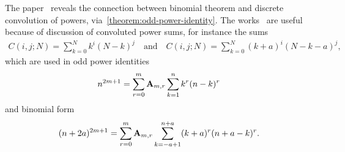 The paper~\cite{on_the_link_between_binomial_theorem_and_discrete_convolution} reveals the connection
between binomial theorem and discrete convolution of powers, via~\eqref{theorem:odd-power-identity}.
The works~\cite{glaisher19121n,neuman1977evaluation,carlitz1977note} are useful because
of discussion of convoluted power sums,
for instance the sums
\begin{align*}
    C(i,j;N) = \sum_{k=0}^{N} k^i (N-k)^j \quad \mathrm{and} \quad C(i,j;N) = \sum_{k=0}^{N} (k+a)^i (N-k-a)^j,
\end{align*}
which are used in odd power identities
\begin{align*}
    n^{2m+1} = \sum_{r=0}^{m} {\mathbf{A}} \sb{m,r} \sum_{k=1}^{n} k^r (n-k)^r
\end{align*}
and binomial form
\begin{align*}
(n+2a)^{2m+1} = \sum_{r=0}^{m} {\mathbf{A}} \sb{m,r} \sum_{k=-a+1}^{n+a} (k+a)^r (n+a-k)^r.
\end{align*}
